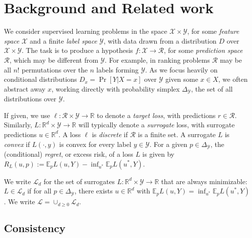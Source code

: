\documentclass{article}
\newcommand{\reals}{\mathbb{R}}
\newcommand{\simplex}{\Delta_\Y}
\newcommand{\E}{\mathbb{E}}
\renewcommand{\L}{\mathcal{L}}
\newcommand{\R}{\mathcal{R}}
\newcommand{\X}{\mathcal{X}}
\newcommand{\Y}{\mathcal{Y}}
\newcommand{\exploss}[3]{\E_{#3} #1(#2,Y)}
\begin{document}
\section{Background and Related work}\label{sec:related-work}

We consider supervised learning problems in the space $\X \times \Y$, for some \emph{feature space} $\X$ and a finite \emph{label space} $\Y$, with data drawn from a distribution $D$ over $\X \times \Y$.
The task is to produce a hypothesis $f: \X \to \R$, for some \emph{prediction space} $\R$, which may be different from $\Y$.
For example, in ranking problems $\R$ may be all $n!$ permutations over the $n$ labels forming $\Y$.
As we focus heavily on conditional distributions $D_x = \Pr[Y|X=x]$ over $\Y$ given some $x \in X$, we often abstract away $x$, working directly with probability simplex $\simplex$, the set of all distributions over $\Y$.

If given, we use $\ell: \R \times \Y \to \reals$ to denote a \emph{target loss}, with predictions $r\in\R$.
Similarly, $L: \reals^d \times \Y \to \reals$ will typically denote a \emph{surrogate} loss, with surrogate predictions $u \in \reals^d$.
A loss $\ell$ is \emph{discrete} if $\R$ is a finite set.
A surrogate $L$ is \emph{convex} if $L(\cdot,y)$ is convex for every label $y \in \Y$.
For a given $p\in\simplex$, the (conditional) \emph{regret}, or excess risk, of a loss $L$ is given by $R_L(u,p) := \exploss{L}{u}{p} - \inf_{u^*} \exploss{L}{u^*}{p}$.

We write $\L_d$ for the set of surrogates $L: \reals^d \times \Y \to \reals$ that are always minimizable: $L \in \L_d$ if for all $p \in \simplex$, there exists $u \in \reals^d$ with $\exploss{L}{u}{p} = \inf_{u^*} \exploss{L}{u^*}{p}$.
We write $\L = \cup_{d \geq 0} \L_d$.




\subsection{Consistency} \label{subsec:consistency}
\end{document}
